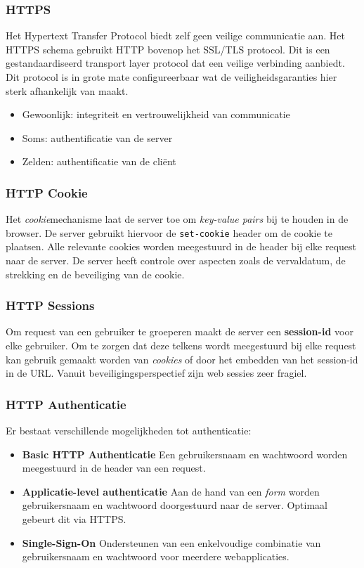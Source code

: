 \documentclass[../main.tex]{subfiles}
\begin{document}
\subsubsection{HTTPS}
Het Hypertext Transfer Protocol biedt zelf geen veilige communicatie aan. Het HTTPS schema gebruikt HTTP bovenop het SSL/TLS protocol. Dit is een gestandaardiseerd transport layer protocol dat een veilige verbinding aanbiedt. Dit protocol is in grote mate configureerbaar wat de veiligheidsgaranties hier sterk afhankelijk van maakt.
\begin{itemize}
	\item Gewoonlijk: integriteit en vertrouwelijkheid van communicatie
	\item Soms: authentificatie van de server
	\item Zelden: authentificatie van de cli\"ent
\end{itemize}

\subsubsection{HTTP Cookie}
Het \textit{cookie}mechanisme laat de server toe om \textit{key-value pairs} bij te houden in de browser. De server gebruikt hiervoor de \texttt{set-cookie} header om de cookie te plaatsen. Alle relevante cookies worden meegestuurd in de header bij elke request naar de server. De server heeft controle over aspecten zoals de vervaldatum, de strekking en de beveiliging van de cookie.

\subsubsection{HTTP Sessions}
Om request van een gebruiker te groeperen maakt de server een \textbf{session-id} voor elke gebruiker. Om te zorgen dat deze telkens wordt meegestuurd bij elke request kan gebruik gemaakt worden van \textit{cookies} of door het embedden van het session-id in de URL. Vanuit beveiligingsperspectief zijn web sessies zeer fragiel.

\subsubsection{HTTP Authenticatie}
Er bestaat verschillende mogelijkheden tot authenticatie:
\begin{itemize}
	\item \textbf{Basic HTTP Authenticatie} Een gebruikersnaam en wachtwoord worden meegestuurd in de header van een request.
	\item \textbf{Applicatie-level authenticatie} Aan de hand van een \textit{form} worden gebruikersnaam en wachtwoord doorgestuurd naar de server. Optimaal gebeurt dit via HTTPS.
	\item \textbf{Single-Sign-On} Ondersteunen van een enkelvoudige combinatie van gebruikersnaam en wachtwoord voor meerdere webapplicaties.
\end{itemize}
\end{document}
